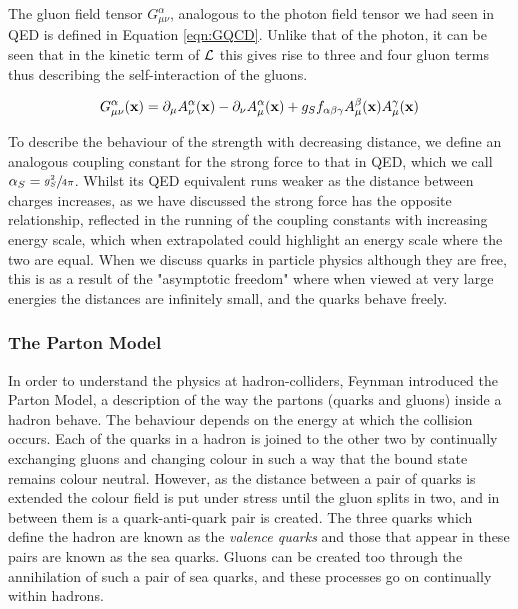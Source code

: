 The gluon field tensor $G^{\alpha}_{\mu \nu}$, analogous to the photon field tensor we had seen in QED is defined in Equation \ref{eqn:GQCD}. Unlike that of the photon, it can be seen that in the kinetic term of ${\mathcal{L}}$ this gives rise to three and four gluon terms thus describing the self-interaction of the gluons. 

\begin{equation}
G^{\alpha}_{\mu \nu} (\mathbf{x}) = \partial_{\mu} A^{\alpha}_{\nu} (\mathbf{x}) - \partial_{\nu}A^{\alpha}_{\mu}(\mathbf{x}) + g_{S} f_{\alpha \beta \gamma} A^{\beta}_{\mu}(\mathbf{x})A^{\gamma}_{\mu}(\mathbf{x})
\label{eqn:GQCD}
\end{equation}



 To describe the behaviour of the strength with decreasing distance, we define an analogous coupling constant for the strong force to that in QED, which we call $\alpha_{S} = \sfrac{g_{S}^{2}}{4\pi}$. Whilst its QED equivalent runs weaker as the distance between charges increases, as we have discussed the strong force has the opposite relationship, reflected in the running of the coupling constants with increasing energy scale, which when extrapolated could highlight an energy scale where the two are equal. When we discuss quarks in particle physics although they are free, this is as a result of the "asymptotic freedom" where when viewed at very large energies the distances are infinitely small, and the quarks behave freely. 
 
 \subsubsection{The Parton Model}
 
 In order to understand the physics at hadron-colliders, Feynman introduced the Parton Model, a description of the way the partons (quarks and gluons) inside a hadron behave. The behaviour depends on the energy at which the collision occurs. Each of the quarks in a hadron is joined to the other two by continually exchanging gluons and changing colour in such a way that the bound state remains colour neutral. However, as the distance between a pair of quarks is extended the colour field is put under stress until the gluon splits in two, and in between them is a quark-anti-quark pair is created. The three quarks which define the hadron are known as the \textit{valence quarks} and those that appear in these pairs are known as the sea quarks. Gluons can be  created too through the annihilation of such a pair of sea quarks, and these processes go on continually within hadrons. 
 
